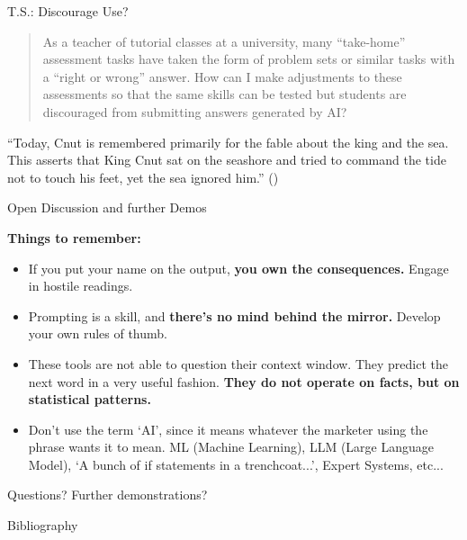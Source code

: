 \documentclass[aspectratio=169]{beamer}
\begin{document}
\begin{frame}{T.S.: Discourage Use?}
    \begin{quote}
        As a teacher of tutorial classes at a university, many “take-home” assessment tasks have taken the form of problem sets or similar tasks with a “right or wrong” answer. How can I make adjustments to these assessments so that the same skills can be tested but students are discouraged from submitting answers generated by AI?
    \end{quote}

``Today, Cnut is remembered primarily for the fable about the king and the sea. This asserts that King Cnut sat on the seashore and tried to command the tide not to touch his feet, yet the sea ignored him.'' (\cite{British_Library_undated-kj})
    
\end{frame}

\begin{frame}{Open Discussion and further Demos}

\textbf{Things to remember:}
\begin{itemize}
    \item If you put your name on the output, \textbf{you own the consequences.} Engage in hostile readings.
    \item Prompting is a skill, and \textbf{there's no mind behind the mirror.} Develop your own rules of thumb.
    \item These tools are not able to question their context window. They predict the next word in a very useful fashion. \textbf{They do not operate on facts, but on statistical patterns.}
    \item Don't use the term `AI', since it means whatever the marketer using the phrase wants it to mean. ML (Machine Learning), LLM (Large Language Model), `A bunch of if statements in a trenchcoat...', Expert Systems, etc... 
\end{itemize}

\vspace{1em}
Questions?  Further demonstrations?



    
\end{frame}

\begin{frame}{Bibliography}
\printbibliography[heading=none]
    
\end{frame}
\end{document}
